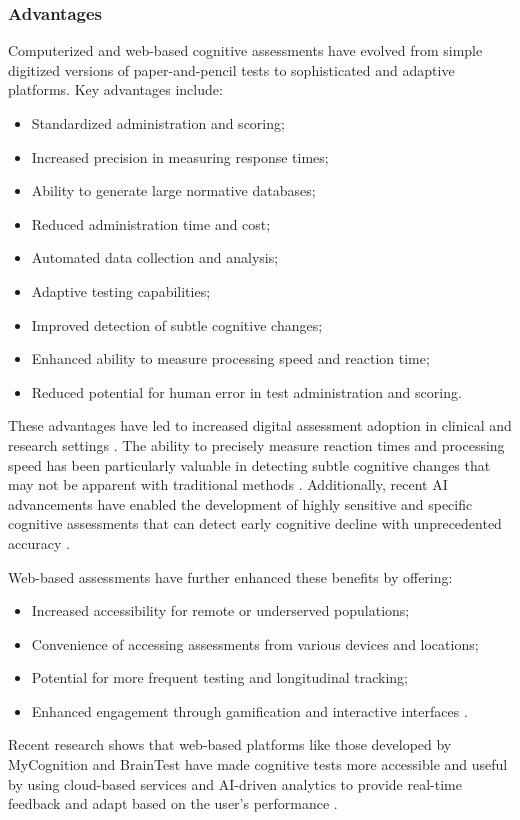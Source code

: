 \subsubsection{Advantages}
Computerized and web-based cognitive assessments have evolved from simple digitized versions of paper-and-pencil tests to sophisticated and adaptive platforms. Key advantages include:
\begin{itemize}
    \item Standardized administration and scoring;
    \item Increased precision in measuring response times;
    \item Ability to generate large normative databases;
    \item Reduced administration time and cost;
    \item Automated data collection and analysis;
    \item Adaptive testing capabilities;
    \item Improved detection of subtle cognitive changes;
    \item Enhanced ability to measure processing speed and reaction time;
    \item Reduced potential for human error in test administration and scoring.
\end{itemize}

These advantages have led to increased digital assessment adoption in clinical and research settings \cite{Wild2008}. The ability to precisely measure reaction times and processing speed has been particularly valuable in detecting subtle cognitive changes that may not be apparent with traditional methods \cite{Zygouris2017}. Additionally, recent AI advancements have enabled the development of highly sensitive and specific cognitive assessments that can detect early cognitive decline with unprecedented accuracy \cite{Petti2020}.

Web-based assessments have further enhanced these benefits by offering:
\begin{itemize}
    \item Increased accessibility for remote or underserved populations;
    \item Convenience of accessing assessments from various devices and locations;
    \item Potential for more frequent testing and longitudinal tracking;
    \item Enhanced engagement through gamification and interactive interfaces \cite{Lumsden2016}.
\end{itemize}
Recent research shows that web-based platforms like those developed by MyCognition and BrainTest have made cognitive tests more accessible and useful by using cloud-based services and AI-driven analytics to provide real-time feedback and adapt based on the user's performance \cite{Wild2021, Grassi2019}.

